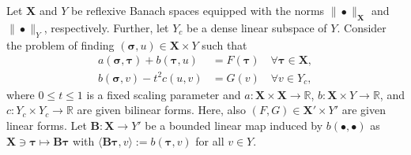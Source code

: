 \documentclass[11pt, reqno, a4paper, twoside]{article}
\newcommand\bsigma{\boldsymbol{\sigma}}
\newcommand\btau{\boldsymbol{\tau}}
\newcommand{\bB}{\mathbf{B}}
\newcommand{\bX}{\mathbf{X}}
\numberwithin{equation}{section}
\numberwithin{remark}{section}
\numberwithin{figure}{section}
\numberwithin{table}{section}
\begin{document}
{%
Let $\bX$ and $Y$ be reflexive Banach spaces equipped with the norms $\|\bullet\|_{\bX}$ and $\|\bullet\|_Y$, respectively. Further, let \(Y_c\) be a dense linear subspace of \(Y.\) Consider the problem of finding $(\bsigma,u) \in \bX\times Y$ such that 
\begin{subequations}\label{eq:abstract}
    \begin{align}
    a(\bsigma,\btau) + b(\btau,u) & = F(\btau) \quad \forall \btau \in \bX, \label{eq:weak.1}\\
    b(\bsigma, v) - t^2c(u,v) & = G(v)\label{eq:weak.2} \quad \forall v\in {Y_c},
\end{align}\end{subequations}
where $0\leq t\leq 1$ is a fixed scaling parameter and  $a:\bX\times \bX \to \mathbb{R}$, $b:\bX\times Y \to \mathbb{R}$, and $c:{Y_c} \times {Y_c} \to \mathbb{R}$ are given bilinear forms. Here, also $(F,G) \in \bX'\times Y'$ are given linear forms.} Let $\bB:\bX\to Y'$ be a bounded linear map induced by $b(\bullet,\bullet)$ as $\bX \ni \btau\mapsto \bB\btau$ with $\langle \bB \btau, v\rangle := b(\btau,v)$ for all $v\in Y$.
\end{document}
